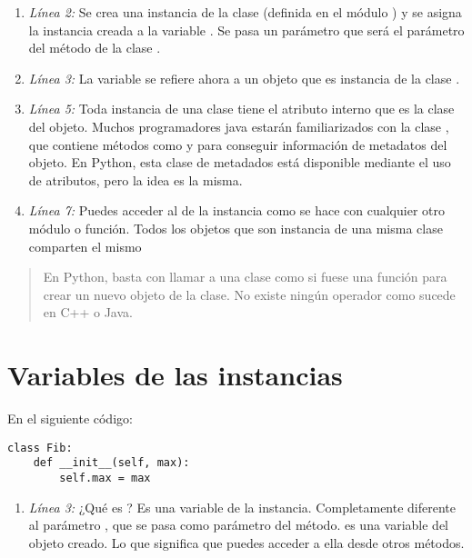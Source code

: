 \begin{enumerate}

\item \emph{Línea 2:} Se crea una instancia de la clase  (definida en el módulo ) y se asigna la instancia creada a la variable . Se pasa un parámetro que será el parámetro  del método  de la clase .

\item \emph{Línea 3:} La variable  se refiere ahora a un objeto que es instancia de la clase .

\item \emph{Línea 5:} Toda instancia de una clase tiene el atributo interno  que es la clase del objeto. Muchos programadores java estarán familiarizados con la clase , que contiene métodos como  y  para conseguir información de metadatos del objeto. En Python, esta clase de metadados está disponible mediante el uso de atributos, pero la idea es la misma.

\item \emph{Línea 7:} Puedes acceder al  de la instancia como se hace con cualquier otro módulo o función. Todos los objetos que son instancia de una misma clase comparten el mismo 

\end{enumerate}

\begin{quote}
En Python, basta con llamar a una clase como si fuese una función para crear un nuevo objeto de la clase. No existe ningún operador  como sucede en C++ o Java.
\end{quote}

\section{Variables de las instancias}

En el siguiente código:

\noindent\begin{minipage}{\textwidth}
\begin{lstlisting}[mathescape=True]
class Fib:
    def __init__(self, max):
        self.max = max
\end{lstlisting}
\end{minipage}

\begin{enumerate}

\item \emph{Línea 3:} ¿Qué es ? Es una variable de la instancia. Completamente diferente al parámetro , que se pasa como parámetro del método.  es una variable del objeto creado. Lo que significa que puedes acceder a ella desde otros métodos.

\end{enumerate}

